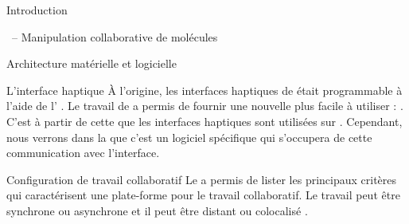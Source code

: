 \documentclass[myfrancais]{mythesis}
\begin{document}
\begin{mypart}{Introduction}
\begin{mychapter}{\myShaddock\ -- Manipulation collaborative de molécules}
\begin{mysection}{Architecture matérielle et logicielle}
\begin{mysubsection}{L'interface haptique}
					À l'origine, les interfaces haptiques de \mySensAble était programmable à l'aide de l' \myGhost {}.
					Le travail de  a permis de fournir une nouvelle  plus facile à utiliser : \myOpenHaptics.
					C'est à partir de cette  que les interfaces haptiques sont utilisées sur \myShaddock.
					Cependant, nous verrons dans la  que c'est un logiciel spécifique qui s'occupera de cette communication avec l'interface.
				\end{mysubsection}
				\begin{mysubsection}{Configuration de travail collaboratif}
					Le  a permis de lister les principaux critères qui caractérisent une plate-forme pour le travail collaboratif.
					Le travail peut être synchrone ou asynchrone et il peut être distant ou colocalisé .


\end{mysubsection}
\end{mysection}
\end{mychapter}
\end{mypart}
\end{document}
